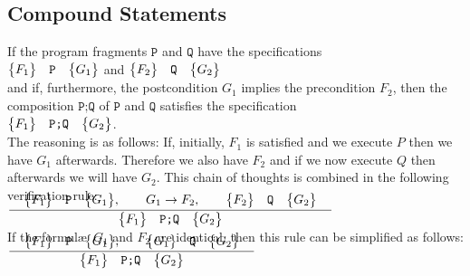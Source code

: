 \subsection{Compound Statements}
If the program fragments $\texttt{P}$ and $\texttt{Q}$ have the specifications
\\[0.2cm]
\hspace*{1.3cm}
$ \bigl\{F_1\bigr\}\quad\texttt{P}\quad\bigl\{G_1\bigr\}$  \quad and \quad $\bigl\{F_2\bigr\}\quad\texttt{Q}\quad\bigl\{G_2\bigr\}$
\\[0.2cm]
and if, furthermore, the postcondition $G_1$ implies the precondition $F_2$,
then the composition $\texttt{P;Q}$ of $\texttt{P}$ and $\texttt{Q}$ satisfies the specification
\\[0.2cm]
\hspace*{1.3cm}
$\bigl\{F_1\bigr\}\quad\texttt{P;Q}\quad\bigl\{G_2\bigr\}$.
\\[0.2cm]
The reasoning is as follows:  If, initially, $F_1$ is satisfied and we execute $P$ then we have
$G_1$ afterwards.  Therefore we also have $F_2$ and if we now execute $Q$ then afterwards we will have
$G_2$.  This chain of thoughts is combined in the following verification rule:
\\[0.4cm]
\hspace*{1.3cm}
$\bruch{\quad\hoare{F_1}{P}{G_1}, \qquad G_1 \rightarrow F_2, \qquad \hoare{F_2}{Q}{G_2}\quad}{\hoare{F_1}{P;Q}{G_2}} 
$
\\[0.2cm] 
If the formul\ae\ $G_1$ and $F_2$ are identical, then this rule can be simplified as follows:
\\[0.4cm]
\hspace*{1.3cm}
$\bruch{\quad\hoare{F_1}{P}{G_1}, \qquad \hoare{G_1}{Q}{G_2}\quad}{ \hoare{F_1}{P;Q}{G_2}}$


